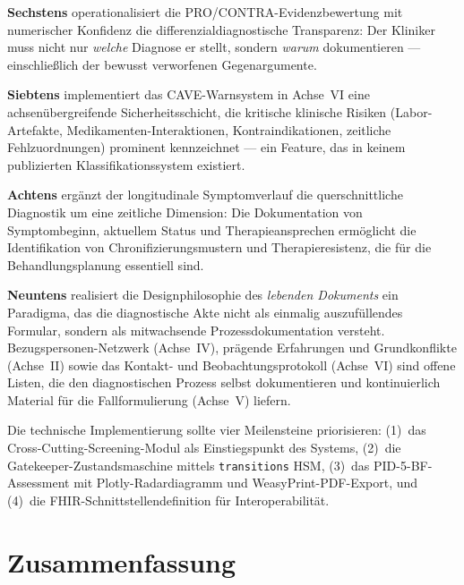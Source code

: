 \documentclass[11pt,a4paper]{article}
\begin{document}
\textbf{Sechstens} operationalisiert die PRO/CONTRA-Evidenzbewertung mit numerischer Konfidenz die differenzialdiagnostische Transparenz: Der Kliniker muss nicht nur \textit{welche} Diagnose er stellt, sondern \textit{warum} dokumentieren --- einschlie\ss{}lich der bewusst verworfenen Gegenargumente.

\textbf{Siebtens} implementiert das CAVE-Warnsystem in Achse~VI eine achsen\"ubergreifende Sicherheitsschicht, die kritische klinische Risiken (Labor-Artefakte, Medikamenten-Interaktionen, Kontraindikationen, zeitliche Fehlzuordnungen) prominent kennzeichnet --- ein Feature, das in keinem publizierten Klassifikationssystem existiert.

\textbf{Achtens} erg\"anzt der longitudinale Symptomverlauf die querschnittliche Diagnostik um eine zeitliche Dimension: Die Dokumentation von Symptombeginn, aktuellem Status und Therapieansprechen erm\"oglicht die Identifikation von Chronifizierungsmustern und Therapieresistenz, die f\"ur die Behandlungsplanung essentiell sind.

\textbf{Neuntens} realisiert die Designphilosophie des \textit{lebenden Dokuments} ein Paradigma, das die diagnostische Akte nicht als einmalig auszuf\"ullendes Formular, sondern als mitwachsende Prozessdokumentation versteht. Bezugspersonen-Netzwerk (Achse~IV), pr\"agende Erfahrungen und Grundkonflikte (Achse~II) sowie das Kontakt- und Beobachtungsprotokoll (Achse~VI) sind offene Listen, die den diagnostischen Prozess selbst dokumentieren und kontinuierlich Material f\"ur die Fallformulierung (Achse~V) liefern.

Die technische Implementierung sollte vier Meilensteine priorisieren: (1)~das Cross-Cutting-Screening-Modul als Einstiegspunkt des Systems, (2)~die Gatekeeper-Zustandsmaschine mittels \texttt{transitions} HSM, (3)~das PID-5-BF-Assessment mit Plotly-Radardiagramm und WeasyPrint-PDF-Export, und (4)~die FHIR-Schnittstellendefinition f\"ur Interoperabilit\"at.


\section{Zusammenfassung}
\label{sec:zusammenfassung}
\end{document}
